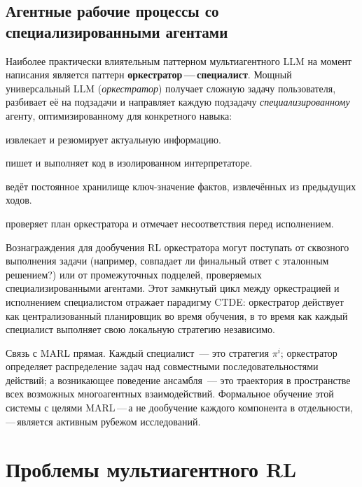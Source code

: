 \subsection{Агентные рабочие процессы со специализированными агентами}

Наиболее практически влиятельным паттерном мультиагентного LLM на момент
написания является паттерн \textbf{оркестратор\,---\,специалист}.
Мощный универсальный LLM (\emph{оркестратор}) получает сложную
задачу пользователя, разбивает её на подзадачи и направляет каждую подзадачу
\emph{специализированному} агенту, оптимизированному для конкретного навыка:
\begin{description}[leftmargin=!, labelwidth=3.5cm]
  \item[Агент веб-поиска] извлекает и резюмирует актуальную информацию.
  \item[Агент кода] пишет и выполняет код в изолированном
    интерпретаторе.
  \item[Агент памяти] ведёт постоянное хранилище ключ-значение фактов,
    извлечённых из предыдущих ходов.
  \item[Агент-критик] проверяет план оркестратора и отмечает
    несоответствия перед исполнением.
\end{description}
Вознаграждения для дообучения RL оркестратора могут поступать от
сквозного выполнения задачи (например, совпадает ли финальный ответ с
эталонным решением?) или от промежуточных подцелей, проверяемых
специализированными агентами. Этот замкнутый цикл между оркестрацией и
исполнением специалистом отражает парадигму CTDE: оркестратор
действует как централизованный планировщик во время обучения, в то время как каждый специалист
выполняет свою локальную стратегию независимо.

Связь с MARL прямая. Каждый специалист~--- это стратегия
$\pi^i$; оркестратор определяет распределение задач над совместными
последовательностями действий; а возникающее поведение ансамбля~--- это
траектория в пространстве всех возможных многоагентных взаимодействий.
Формальное обучение этой системы с целями MARL\,---\,а не
дообучение каждого компонента в отдельности,\,---\,является активным рубежом исследований.

\section{Проблемы мультиагентного RL}
\label{sec:marl-challenges}

